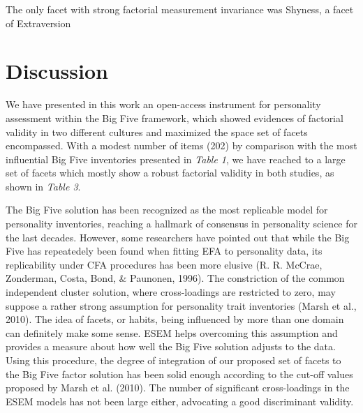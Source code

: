 \documentclass[,man,floatsintext]{apa6}
\begin{document}
The only facet with strong factorial measurement invariance was Shyness,
a facet of Extraversion

\vspace{5mm}

\vspace{5mm}

\section{Discussion}\label{discussion}

We have presented in this work an open-access instrument for personality
assessment within the Big Five framework, which showed evidences of
factorial validity in two different cultures and maximized the space set
of facets encompassed. With a modest number of items (202) by comparison
with the most influential Big Five inventories presented in \emph{Table
1}, we have reached to a large set of facets which mostly show a robust
factorial validity in both studies, as shown in \emph{Table 3}.

The Big Five solution has been recognized as the most replicable model
for personality inventories, reaching a hallmark of consensus in
personality science for the last decades. However, some researchers have
pointed out that while the Big Five has repeatedely been found when
fitting EFA to personality data, its replicability under CFA procedures
has been more elusive (R. R. McCrae, Zonderman, Costa, Bond, \&
Paunonen, 1996). The constriction of the common independent cluster
solution, where cross-loadings are restricted to zero, may suppose a
rather strong assumption for personality trait inventories (Marsh et
al., 2010). The idea of facets, or habits, being influenced by more than
one domain can definitely make some sense. ESEM helps overcoming this
assumption and provides a measure about how well the Big Five solution
adjusts to the data. Using this procedure, the degree of integration of
our proposed set of facets to the Big Five factor solution has been
solid enough according to the cut-off values proposed by Marsh et al.
(2010). The number of significant cross-loadings in the ESEM models has
not been large either, advocating a good discriminant validity.
\end{document}
